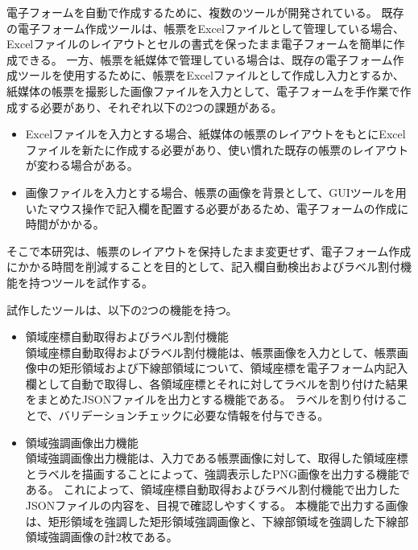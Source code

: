 \documentclass[uplatex, report, a4j, 10pt]{jsbook}
\begin{document}
電子フォームを自動で作成するために、複数のツールが開発されている。
既存の電子フォーム作成ツールは、帳票をExcelファイルとして管理している場合、Excelファイルのレイアウトとセルの書式を保ったまま電子フォームを簡単に作成できる。
一方、帳票を紙媒体で管理している場合は、既存の電子フォーム作成ツールを使用するために、帳票をExcelファイルとして作成し入力とするか、紙媒体の帳票を撮影した画像ファイルを入力として、電子フォームを手作業で作成する必要があり、それぞれ以下の2つの課題がある。

\begin{itemize}
  \item Excelファイルを入力とする場合、紙媒体の帳票のレイアウトをもとにExcelファイルを新たに作成する必要があり、使い慣れた既存の帳票のレイアウトが変わる場合がある。
  \item 画像ファイルを入力とする場合、帳票の画像を背景として、GUIツールを用いたマウス操作で記入欄を配置する必要があるため、電子フォームの作成に時間がかかる。
\end{itemize}

そこで本研究は、帳票のレイアウトを保持したまま変更せず、電子フォーム作成にかかる時間を削減することを目的として、記入欄自動検出およびラベル割付機能を持つツールを試作する。

試作したツールは、以下の2つの機能を持つ。

\begin{itemize}
  \item 領域座標自動取得およびラベル割付機能\\
      領域座標自動取得およびラベル割付機能は、帳票画像を入力として、帳票画像中の矩形領域および下線部領域について、領域座標を電子フォーム内記入欄として自動で取得し、各領域座標とそれに対してラベルを割り付けた結果をまとめたJSONファイルを出力とする機能である。
      ラベルを割り付けることで、バリデーションチェックに必要な情報を付与できる。
  \item 領域強調画像出力機能\\
      領域強調画像出力機能は、入力である帳票画像に対して、取得した領域座標とラベルを描画することによって、強調表示したPNG画像を出力する機能である。
      これによって、領域座標自動取得およびラベル割付機能で出力したJSONファイルの内容を、目視で確認しやすくする。
      本機能で出力する画像は、矩形領域を強調した矩形領域強調画像と、下線部領域を強調した下線部領域強調画像の計2枚である。
\end{itemize}

\end{document}
